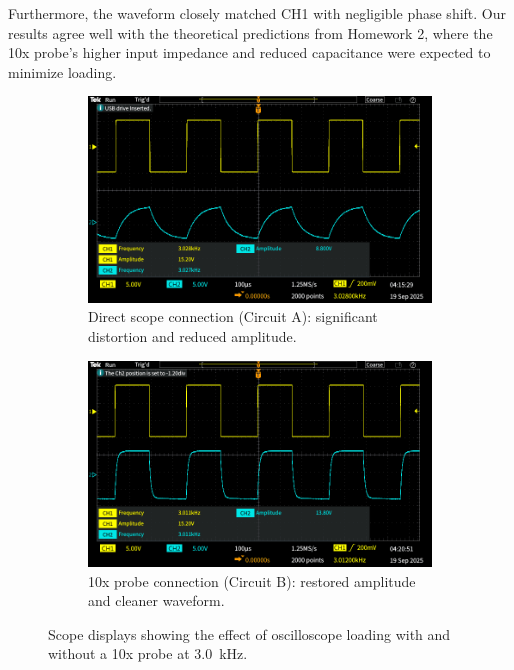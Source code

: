 \documentclass{article}
\begin{document}
\noindent Furthermore, the waveform closely matched CH1 with negligible phase
shift. Our results agree well with the theoretical predictions from Homework 2,
where the 10x probe's higher input impedance and reduced capacitance were
expected to minimize loading.

\begin{figure}[H]
    \centering
    \begin{subfigure}[t]{0.48\textwidth}
        \centering
        \includegraphics[width=\linewidth]{4.1b.A.png}
        \caption{Direct scope connection (Circuit A): significant distortion and reduced amplitude.}
        \label{fig:circuit_a}
    \end{subfigure}
    \hfill
    \begin{subfigure}[t]{0.48\textwidth}
        \centering
        \includegraphics[width=\linewidth]{4.1b.B.png}
        \caption{10x probe connection (Circuit B): restored amplitude and cleaner waveform.}
        \label{fig:circuit_b}
    \end{subfigure}
    \caption{Scope displays showing the effect of oscilloscope loading with and without a 10x probe at \SI{3.0}{\kilo\hertz}.}
    \label{fig:circuits_ab}
\end{figure}
\end{document}

